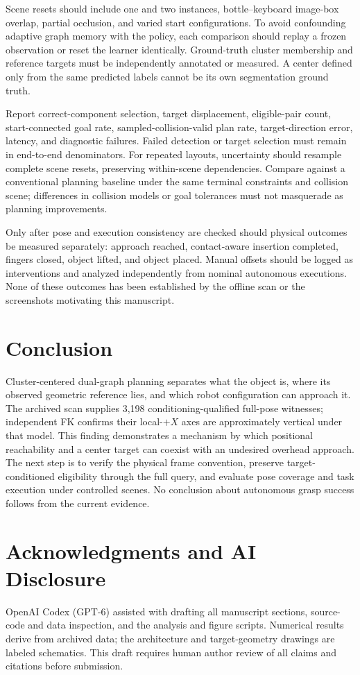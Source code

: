 \documentclass[letterpaper,10pt,conference]{ieeeconf}
\begin{document}
Scene resets should include one and two instances, bottle--keyboard image-box overlap, partial occlusion, and varied start configurations. To avoid confounding adaptive graph memory with the policy, each comparison should replay a frozen observation or reset the learner identically. Ground-truth cluster membership and reference targets must be independently annotated or measured. A center defined only from the same predicted labels cannot be its own segmentation ground truth.

Report correct-component selection, target displacement, eligible-pair count, start-connected goal rate, sampled-collision-valid plan rate, target-direction error, latency, and diagnostic failures. Failed detection or target selection must remain in end-to-end denominators. For repeated layouts, uncertainty should resample complete scene resets, preserving within-scene dependencies. Compare against a conventional planning baseline under the same terminal constraints and collision scene; differences in collision models or goal tolerances must not masquerade as planning improvements.

Only after pose and execution consistency are checked should physical outcomes be measured separately: approach reached, contact-aware insertion completed, fingers closed, object lifted, and object placed. Manual offsets should be logged as interventions and analyzed independently from nominal autonomous executions. None of these outcomes has been established by the offline scan or the screenshots motivating this manuscript.

\section{Conclusion}
Cluster-centered dual-graph planning separates what the object is, where its observed geometric reference lies, and which robot configuration can approach it. The archived scan supplies 3,198 conditioning-qualified full-pose witnesses; independent FK confirms their local-$+X$ axes are approximately vertical under that model. This finding demonstrates a mechanism by which positional reachability and a center target can coexist with an undesired overhead approach. The next step is to verify the physical frame convention, preserve target-conditioned eligibility through the full query, and evaluate pose coverage and task execution under controlled scenes. No conclusion about autonomous grasp success follows from the current evidence.

\section*{Acknowledgments and AI Disclosure}
OpenAI Codex (GPT-6) assisted with drafting all manuscript sections, source-code and data inspection, and the analysis and figure scripts. Numerical results derive from archived data; the architecture and target-geometry drawings are labeled schematics. This draft requires human author review of all claims and citations before submission.



\end{document}
